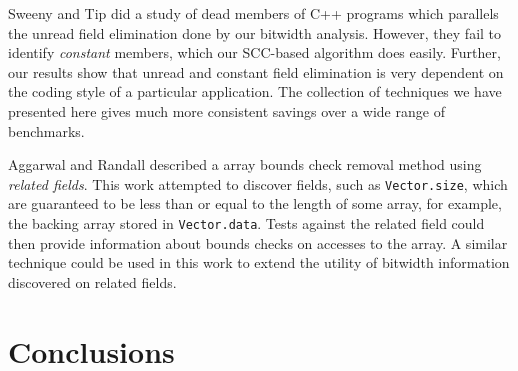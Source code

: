 \documentclass[preprint]{acmconf}
\begin{document}
Sweeny and Tip \cite{SweeneyTip98DeadDataMembers} did a study of dead
members of C++ programs which parallels the unread field
elimination done by our bitwidth analysis.  However, they
fail to identify {\it constant} members, which our SCC-based algorithm
does easily.  Further, our results show that unread and constant field
elimination is very dependent on the coding style of a particular
application.  The collection of techniques we have presented here
gives much more consistent savings over a wide range of benchmarks.

Aggarwal and Randall \cite{aggarwal01} described a array bounds check
removal method using {\it related fields}.  This work attempted to
discover fields, such as {\tt Vector.size}, which are guaranteed to be
less than or equal to the length of some array, for example, the
backing array stored in {\tt Vector.data}.  Tests against the related
field could then provide information about bounds checks on accesses
to the array.  A similar technique could be used in this work to
extend the utility of bitwidth information discovered on related fields.


\section{Conclusions}



%
\end{document}
